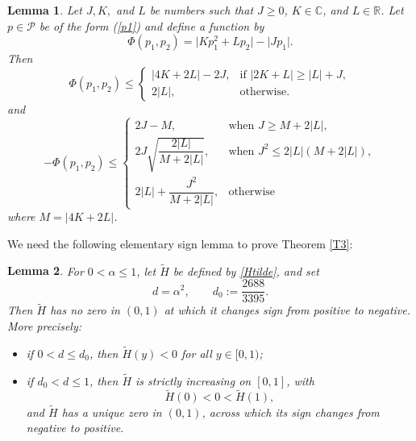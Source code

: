 \documentclass[11pt,reqno]{amsart}
\newtheorem{lem}{Lemma}[section]
\numberwithin{equation}{section}
\begin{document}
\begin{lem}\label{L6}\cite{SimThomas2020}
Let $J, K,$ and $L$ be numbers such that $J \ge 0$, $K \in \mathbb{C}$, and $L \in \mathbb{R}$. 
Let $p \in \mathcal{P}$ be of the form (\ref{p1}) and define a function by
\[
\Phi(p_1,p_2) = \big| K p_1^2 + L p_2 \big| - \big| J p_1 \big|.
\]
Then 
\[
\Phi(p_{1}, p_{2}) \le 
\begin{cases}
|4K + 2L| - 2J, & \text{if } |2K + L| \ge |L| + J, \\[6pt]
2|L|, & \text{otherwise.}
\end{cases}
\]
and
\[
- \Phi(p_1,p_2) \le 
\begin{cases}
2J - M, & \text{when } J \ge M + 2|L|, \\[6pt]
2J \sqrt{\dfrac{ 2|L|}{M + 2|L|}}, & \text{when } J^2 \le 2|L|(M + 2|L|), \\[10pt]
2|L| +\dfrac{ J^2}{M + 2|L|}, & \text{otherwise}
\end{cases}
\]
where $M=|4K+2L|$.
\end{lem}

We need the following elementary sign lemma to prove Theorem \eqref{T3}:

\begin{lem}\label{lem:Hsign}
For $0<\alpha\le 1$, let $\widetilde H$ be defined by \eqref{Htilde}, and set
\[
d=\alpha^2,\qquad d_0:=\frac{2688}{3395}.
\]
Then $\widetilde H$ has no zero in $(0,1)$ at which it changes sign from positive to negative. More precisely:
\begin{itemize}
\item[(i)] if $0<d\le d_0$, then $\widetilde H(y)<0$ for all $y\in[0,1)$;
\item[(ii)] if $d_0<d\le1$, then $\widetilde H$ is strictly increasing on $[0,1]$, with
\[
\widetilde H(0)<0<\widetilde H(1),
\]
and $\widetilde H$ has a unique zero in $(0,1)$, across which its sign changes from negative to positive.
\end{itemize}
\end{lem}
\end{document}
